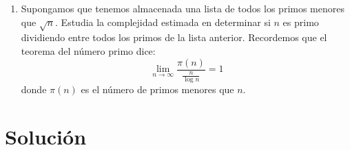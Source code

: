 	\begin{enumerate}
		\item Supongamos que tenemos almacenada una lista de todos los primos menores que $\sqrt{n}$. Estudia la
		complejidad estimada en determinar si $n$ es primo dividiendo entre todos los primos de la lista anterior.
		Recordemos que el teorema del número primo dice:
		$$\lim\limits_{n \rightarrow \infty} \frac{\pi (n)}{\frac{n}{\log n}} = 1$$
		donde $\pi (n)$ es el número de primos menores que $n$.
	\end{enumerate}
\section*{Solución}
